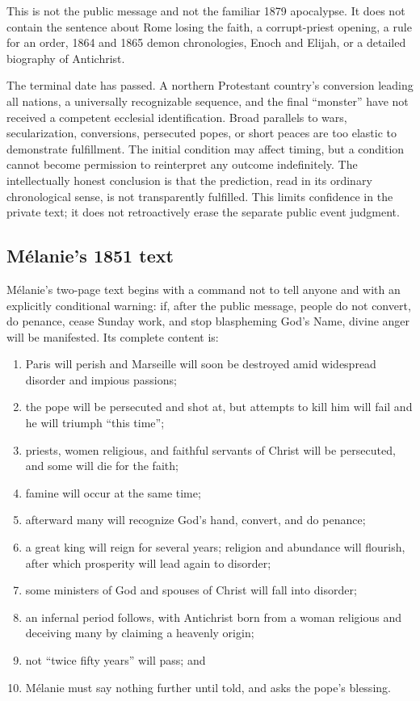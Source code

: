 This is not the public message and not the familiar 1879 apocalypse. It does not contain the sentence about Rome losing the faith, a corrupt-priest opening, a rule for an order, 1864 and 1865 demon chronologies, Enoch and Elijah, or a detailed biography of Antichrist.

The terminal date has passed. A northern Protestant country's conversion leading all nations, a universally recognizable sequence, and the final ``monster'' have not received a competent ecclesial identification. Broad parallels to wars, secularization, conversions, persecuted popes, or short peaces are too elastic to demonstrate fulfillment. The initial condition may affect timing, but a condition cannot become permission to reinterpret any outcome indefinitely. The intellectually honest conclusion is that the prediction, read in its ordinary chronological sense, is not transparently fulfilled. This limits confidence in the private text; it does not retroactively erase the separate public event judgment.

\subsection{Mélanie's 1851 text}

Mélanie's two-page text begins with a command not to tell anyone and with an explicitly conditional warning: if, after the public message, people do not convert, do penance, cease Sunday work, and stop blaspheming God's Name, divine anger will be manifested. Its complete content is:

\begin{enumerate}
  \item Paris will perish and Marseille will soon be destroyed amid widespread disorder and impious passions;
  \item the pope will be persecuted and shot at, but attempts to kill him will fail and he will triumph ``this time'';
  \item priests, women religious, and faithful servants of Christ will be persecuted, and some will die for the faith;
  \item famine will occur at the same time;
  \item afterward many will recognize God's hand, convert, and do penance;
  \item a great king will reign for several years; religion and abundance will flourish, after which prosperity will lead again to disorder;
  \item some ministers of God and spouses of Christ will fall into disorder;
  \item an infernal period follows, with Antichrist born from a woman religious and deceiving many by claiming a heavenly origin;
  \item not ``twice fifty years'' will pass; and
  \item Mélanie must say nothing further until told, and asks the pope's blessing.
\end{enumerate}

